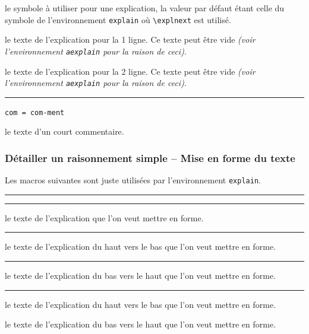 \documentclass[12pt,a4paper]{book}
\newcommand\env[1]{\texttt{#1}}
\newcommand\macro[1]{\env{\textbackslash{}#1}}
\theoremstyle{definition}
\newcommand\separation{
	\medskip
	\hfill\rule{0.5\textwidth}{0.75pt}\hfill
	\medskip
}
\newcommand\mwhyprefix[2]{%
	\texttt{#1 = #1-#2}%
}
\begin{document}
{{

\IDoption{} le symbole à utiliser pour une explication, la valeur par défaut étant celle du symbole de l'environnement \env{explain} où \macro{explnext} est utilisé.

 le texte de l'explication pour la 1\iere{} ligne.
          Ce texte peut être vide \emph{(voir l'environnement \env{aexplain} pour la raison de ceci)}.

 le texte de l'explication pour la 2\ieme{} ligne.
          Ce texte peut être vide \emph{(voir l'environnement \env{aexplain} pour la raison de ceci)}.


\separation


  \hfill \mwhyprefix{com}{ment}



\IDarg{} le texte d'un court commentaire.




\subsubsection{Détailler un raisonnement simple -- Mise en forme du texte}

Les macros suivantes sont juste utilisées par l'environnement \env{explain}.


\separation




\separation



\IDarg{} le texte de l'explication que l'on veut mettre en forme.


\separation



\IDarg{} le texte de l'explication du haut vers le bas que l'on veut mettre en forme.


\separation



\IDarg{} le texte de l'explication du bas vers le haut que l'on veut mettre en forme.


\separation



 le texte de l'explication du haut vers le bas que l'on veut mettre en forme.

 le texte de l'explication du bas vers le haut que l'on veut mettre en forme.


}}
\end{document}
